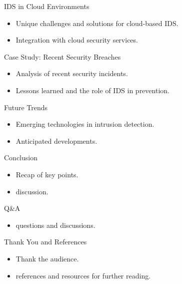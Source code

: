 \documentclass{beamer}
\begin{document}
\begin{frame}{IDS in Cloud Environments}
    \begin{itemize}
        \item Unique challenges and solutions for cloud-based IDS.
        \item Integration with cloud security services.
    \end{itemize}
\end{frame}


\begin{frame}{Case Study: Recent Security Breaches}
    \begin{itemize}
        \item Analysis of recent security incidents.
        \item Lessons learned and the role of IDS in prevention.
    \end{itemize}
\end{frame}


\begin{frame}{Future Trends}
    \begin{itemize}
        \item Emerging technologies in intrusion detection.
        \item Anticipated developments.
    \end{itemize}
\end{frame}


\begin{frame}{Conclusion}
    \begin{itemize}
        \item Recap of key points.
        \item discussion.
    \end{itemize}
\end{frame}


\begin{frame}{Q\&A}
    \begin{itemize}
        \item questions and discussions.
    \end{itemize}
\end{frame}


\begin{frame}{Thank You and References}
    \begin{itemize}
        \item Thank the audience.
        \item references and resources for further reading.
    \end{itemize}
\end{frame}
\end{document}
